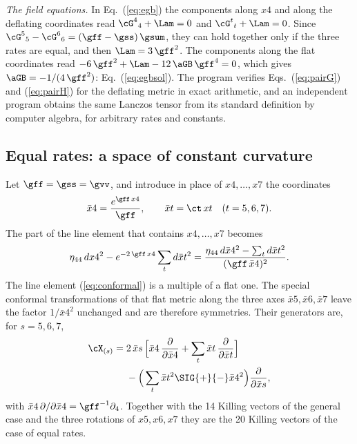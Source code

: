 \emph{The field equations.} In Eq.~(\ref{eq:egb}) the components along $x4$ and along the deflating
coordinates read $\cG^{4}{}_{4}+\Lam=0$ and $\cG^{t}{}_{t}+\Lam=0$. Since
$\cG^{5}{}_{5}-\cG^{6}{}_{6}=(\gff-\gss)\,\gsum$, they can hold together only if the three rates are
equal, and then $\Lam=3\,\gff^{2}$. The components along the flat coordinates read
$-6\,\gff^{2}+\Lam-12\,\aGB\,\gff^{4}=0$, which gives $\aGB=-1/(4\,\gff^{2})$:
Eq.~(\ref{eq:egbsol}). The program verifies Eqs.~(\ref{eq:pairG}) and (\ref{eq:pairH}) for the
deflating metric in exact arithmetic, and an independent program obtains the same Lanczos tensor
from its standard definition by computer algebra, for arbitrary rates and constants.

\subsection{Equal rates: a space of constant curvature}

Let $\gff=\gss=\gvv$, and introduce in place of $x4,\dots,x7$ the coordinates
\begin{equation}
\bar x4=\frac{e^{\gff\,x4}}{\gff},\qquad\bar xt=\ct\,xt\quad(t=5,6,7).
\end{equation}
The part of the line element that contains $x4,\dots,x7$ becomes
\begin{equation}
\eta_{44}\,dx4^{2}-e^{-2\,\gff\,x4}\sum_t d\bar xt^{2}
=\frac{\eta_{44}\,d\bar x4^{2}-\sum_t d\bar xt^{2}}{(\gff\,\bar x4)^{2}} .
\label{eq:conformal}
\end{equation}
 The line element (\ref{eq:conformal}) is a multiple of a flat one. The
special conformal transformations of that flat metric along the three axes $\bar x5,\bar x6,\bar x7$
leave the factor $1/\bar x4^{2}$ unchanged and are therefore symmetries. Their generators are, for
$s=5,6,7$,
\begin{equation}
\begin{aligned}
\cX_{(s)}={}&2\,\bar xs\,\Big[\bar x4\,\frac{\partial}{\partial\bar x4}+\sum_t\bar xt\,\frac{\partial}{\partial\bar xt}\Big]\\
&-\Big(\sum_t\bar xt^{2}\SIG{+}{-}\bar x4^{2}\Big)\frac{\partial}{\partial\bar xs},
\end{aligned}
\label{eq:special}
\end{equation}
with $\bar x4\,\partial/\partial\bar x4=\gff^{-1}\partial_4$. Together with the 14 Killing vectors of
the general case and the three rotations of $x5,x6,x7$ they are the 20 Killing vectors of the case
of equal rates.

